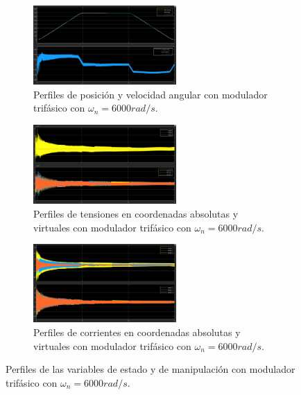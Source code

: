\documentclass{article}
\begin{document}
\begin{figure}[H]
    \centering
    \begin{subfigure}[t]{\textwidth}
        \centering
        \includegraphics[width=0.6\textwidth]{Imagenes/Posicion_Velocidad_ModuladorTNL.png}
        \caption{Perfiles de posición y velocidad angular con modulador trifásico con \(\omega_n = 6000rad/s\).}
        \label{fig:Posicion_Velocidad_ModuladorTNL}
    \end{subfigure}
    
    \vspace{0.5cm} %
    
    \begin{subfigure}[t]{\textwidth}
        \centering
        \includegraphics[width=0.6\textwidth]{Imagenes/Consignas_Tensiones_ModuladorTNL.png}
        \caption{Perfiles de tensiones en coordenadas absolutas y virtuales con modulador trifásico con \(\omega_n = 6000rad/s\).}
        \label{fig:Consignas_Tensiones_ModuladorTNL}
    \end{subfigure}

    \vspace{0.5cm} %
    
    \begin{subfigure}[t]{\textwidth}
        \centering
        \includegraphics[width=0.6\textwidth]{Imagenes/Corrientes_ModuladorTNL.png}
        \caption{Perfiles de corrientes en coordenadas absolutas y virtuales con modulador trifásico con \(\omega_n = 6000rad/s\).}
        \label{fig:Corrientes_ModuladorTNL}
    \end{subfigure}
    \caption{Perfiles de las variables de estado y de manipulación con modulador trifásico con \(\omega_n = 6000rad/s\).}
    \label{fig:simulacion_modulador_tension_NI}
\end{figure}
\end{document}
